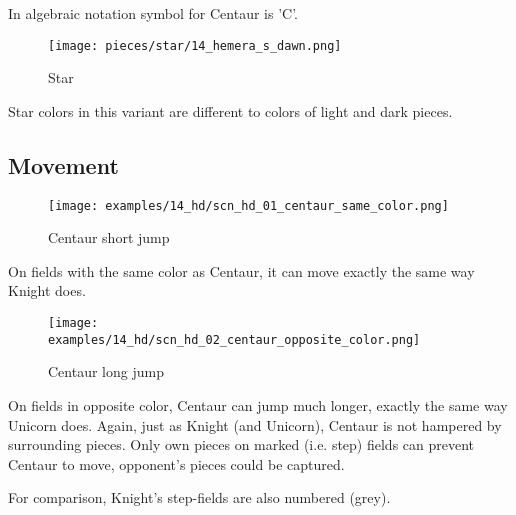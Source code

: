 In algebraic notation symbol for Centaur is ’C’.

\noindent
\begin{wrapfigure}{l}{0.4\textwidth}
\centering
\texttt{[image: pieces/star/14\_hemera\_s\_dawn.png]}
\caption{Star}
\label{fig:star/14_hemera_s_dawn}
\end{wrapfigure}
Star colors in this variant are different to colors of light and dark pieces.

\clearpage %

\subsection*{Movement}

\noindent
\begin{wrapfigure}{l}{0.4\textwidth}
\centering
\texttt{[image: examples/14\_hd/scn\_hd\_01\_centaur\_same\_color.png]}
\caption{Centaur short jump}
\label{fig:scn_hd_01_centaur_same_color}
\end{wrapfigure}
On fields with the same color as Centaur, it can move exactly the
same way Knight does.

\noindent
\begin{wrapfigure}{l}{0.6\textwidth}
\centering
\texttt{[image: examples/14\_hd/scn\_hd\_02\_centaur\_opposite\_color.png]}
\caption{Centaur long jump}
\label{fig:scn_hd_02_centaur_opposite_color}
\end{wrapfigure}
On fields in opposite color, Centaur can jump much longer, exactly the
same way Unicorn does. Again, just as Knight (and Unicorn), Centaur is
not hampered by surrounding pieces. Only own pieces on marked (i.e. step)
fields can prevent Centaur to move, opponent's pieces could be captured.

For comparison, Knight's step-fields are also numbered (grey).



